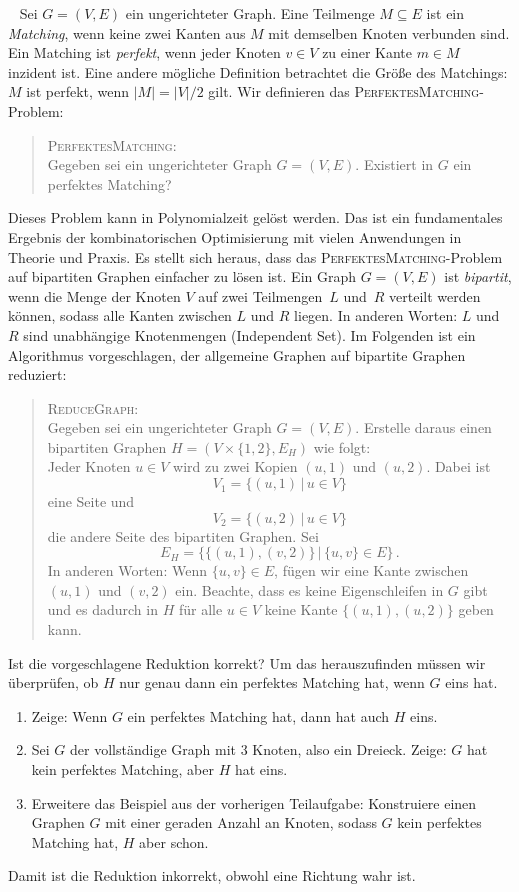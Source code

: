 \documentclass{uebung_cs}
\begin{document}
\begin{aufgabe}\
	Sei $G = (V,E)$ ein ungerichteter Graph. Eine Teilmenge $M \subseteq E$ ist ein \textit{Matching}, wenn keine zwei Kanten aus $M$ mit demselben Knoten verbunden sind. Ein Matching ist \textit{perfekt}, wenn jeder Knoten $v \in V$ zu einer Kante $m \in M$ inzident ist. Eine andere mögliche Definition betrachtet die Größe des Matchings: $M$ ist perfekt, wenn $|M| = |V|/2$ gilt. Wir definieren das \textsc{PerfektesMatching}-Problem:
	\begin{quote}
		\textsc{PerfektesMatching}:\\
		Gegeben sei ein ungerichteter Graph $G = (V,E)$. Existiert in $G$ ein perfektes Matching?
	\end{quote}
	Dieses Problem kann in Polynomialzeit gelöst werden. Das ist ein fundamentales Ergebnis der kombinatorischen Optimisierung mit vielen Anwendungen in Theorie und Praxis. Es stellt sich heraus, dass das \textsc{PerfektesMatching}-Problem auf bipartiten Graphen einfacher zu lösen ist. Ein Graph $G = (V,E)$ ist \textit{bipartit}, wenn die Menge der Knoten $V$ auf zwei Teilmengen~$L$ und~$R$ verteilt werden können, sodass alle Kanten zwischen $L$ und $R$ liegen. In anderen Worten: $L$ und $R$ sind unabhängige Knotenmengen (Independent Set). Im Folgenden ist ein Algorithmus vorgeschlagen, der allgemeine Graphen auf bipartite Graphen reduziert:
	\begin{quote}
		\textsc{ReduceGraph}:\\
		Gegeben sei ein ungerichteter Graph $G = (V,E)$. Erstelle daraus einen bipartiten Graphen $H = (V \times \{1,2\},E_H)$ wie folgt:\\
		Jeder Knoten $u \in V$ wird zu zwei Kopien $(u,1)$ und $(u,2)$. Dabei ist \[V_1 = \{(u,1)\,|\,u\in V\}\] eine Seite und \[V_2 = \{(u,2)\,|\,u\in V\}\] die andere Seite des bipartiten Graphen. Sei \[E_H = \{\{(u,1),(v,2)\}\,|\,\{u,v\} \in E\}\,.\] In anderen Worten: Wenn $\{u,v\} \in E$, fügen wir eine Kante zwischen $(u,1)$ und $(v,2)$ ein. Beachte, dass es keine Eigenschleifen in $G$ gibt und es dadurch in $H$ für alle $u \in V$ keine Kante  $\{(u,1),(u,2)\}$ geben kann.
	\end{quote}
	Ist die vorgeschlagene Reduktion korrekt? Um das herauszufinden müssen wir überprüfen, ob $H$ nur genau dann ein perfektes Matching hat, wenn $G$ eins hat.
	\begin{enumerate}
		\item Zeige: Wenn $G$ ein perfektes Matching hat, dann hat auch $H$ eins.
		\item Sei $G$ der vollständige Graph mit $3$ Knoten, also ein Dreieck. Zeige: $G$ hat kein perfektes Matching, aber $H$ hat eins.
		\item Erweitere das Beispiel aus der vorherigen Teilaufgabe: Konstruiere einen Graphen $G$ mit einer geraden Anzahl an Knoten, sodass $G$ kein perfektes Matching hat, $H$ aber schon.
	\end{enumerate}
	Damit ist die Reduktion inkorrekt, obwohl eine Richtung wahr ist.
\end{aufgabe}
\end{document}
